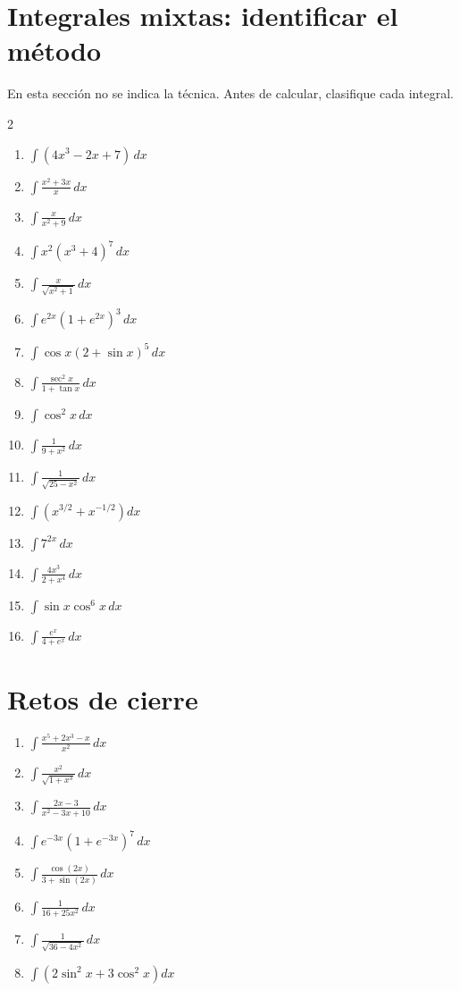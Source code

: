 \documentclass[11pt]{article}
\begin{document}
\section{Integrales mixtas: identificar el método}
En esta sección no se indica la técnica. Antes de calcular, clasifique cada integral.
\begin{multicols}{2}\begin{enumerate}
\item $\displaystyle \int(4x^3-2x+7)\,dx$
\item $\displaystyle \int\frac{x^2+3x}{x}\,dx$
\item $\displaystyle \int\frac{x}{x^2+9}\,dx$
\item $\displaystyle \int x^2(x^3+4)^7\,dx$
\item $\displaystyle \int\frac{x}{\sqrt{x^2+1}}\,dx$
\item $\displaystyle \int e^{2x}(1+e^{2x})^3\,dx$
\item $\displaystyle \int\cos x(2+\sin x)^5\,dx$
\item $\displaystyle \int\frac{\sec^2x}{1+\tan x}\,dx$
\item $\displaystyle \int\cos^2x\,dx$
\item $\displaystyle \int\frac{1}{9+x^2}\,dx$
\item $\displaystyle \int\frac{1}{\sqrt{25-x^2}}\,dx$
\item $\displaystyle \int\left(x^{3/2}+x^{-1/2}\right)dx$
\item $\displaystyle \int 7^{2x}\,dx$
\item $\displaystyle \int\frac{4x^3}{2+x^4}\,dx$
\item $\displaystyle \int\sin x\cos^6x\,dx$
\item $\displaystyle \int\frac{e^x}{4+e^x}\,dx$
\end{enumerate}\end{multicols}

\section{Retos de cierre}
\begin{enumerate}
\item $\displaystyle \int\frac{x^5+2x^3-x}{x^2}\,dx$
\item $\displaystyle \int\frac{x^2}{\sqrt{1+x^3}}\,dx$
\item $\displaystyle \int\frac{2x-3}{x^2-3x+10}\,dx$
\item $\displaystyle \int e^{-3x}(1+e^{-3x})^7\,dx$
\item $\displaystyle \int\frac{\cos(2x)}{3+\sin(2x)}\,dx$
\item $\displaystyle \int\frac{1}{16+25x^2}\,dx$
\item $\displaystyle \int\frac{1}{\sqrt{36-4x^2}}\,dx$
\item $\displaystyle \int\left(2\sin^2x+3\cos^2x\right)dx$
\end{enumerate}
\end{document}

